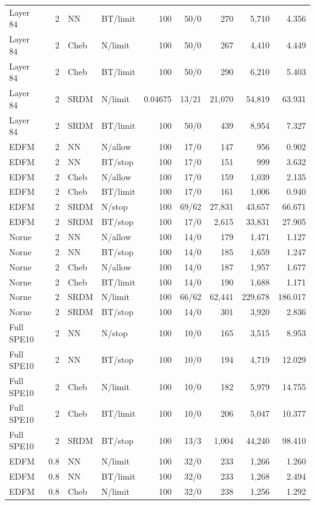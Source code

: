 {\begin{longtable}{lrllrrrrr}
Layer 84 & 2 & NN & BT/limit & 100 & 50/0 & 270 & 5,710 & 4.356 \\
Layer 84 & 2 & Cheb & N/limit & 100 & 50/0 & 267 & 4,410 & 4.449 \\
Layer 84 & 2 & Cheb & BT/limit & 100 & 50/0 & 290 & 6,210 & 5.403 \\
Layer 84 & 2 & SRDM & N/limit & 0.04675 & 13/21 & 21,070 & 54,819 & 63.931 \\
Layer 84 & 2 & SRDM & BT/limit & 100 & 50/0 & 439 & 8,954 & 7.327 \\
EDFM & 2 & NN & N/allow & 100 & 17/0 & 147 & 956 & 0.902 \\
EDFM & 2 & NN & BT/stop & 100 & 17/0 & 151 & 999 & 3.632 \\
EDFM & 2 & Cheb & N/allow & 100 & 17/0 & 159 & 1,039 & 2.135 \\
EDFM & 2 & Cheb & BT/limit & 100 & 17/0 & 161 & 1,006 & 0.940 \\
EDFM & 2 & SRDM & N/stop & 100 & 69/62 & 27,831 & 43,657 & 66.671 \\
EDFM & 2 & SRDM & BT/stop & 100 & 17/0 & 2,615 & 33,831 & 27.905 \\
Norne & 2 & NN & N/allow & 100 & 14/0 & 179 & 1,471 & 1.127 \\
Norne & 2 & NN & BT/stop & 100 & 14/0 & 185 & 1,659 & 1.247 \\
Norne & 2 & Cheb & N/allow & 100 & 14/0 & 187 & 1,957 & 1.677 \\
Norne & 2 & Cheb & BT/limit & 100 & 14/0 & 190 & 1,688 & 1.171 \\
Norne & 2 & SRDM & N/limit & 100 & 66/62 & 62,441 & 229,678 & 186.017 \\
Norne & 2 & SRDM & BT/stop & 100 & 14/0 & 301 & 3,920 & 2.836 \\
Full SPE10 & 2 & NN & N/stop & 100 & 10/0 & 165 & 3,515 & 8.953 \\
Full SPE10 & 2 & NN & BT/stop & 100 & 10/0 & 194 & 4,719 & 12.029 \\
Full SPE10 & 2 & Cheb & N/limit & 100 & 10/0 & 182 & 5,979 & 14.755 \\
Full SPE10 & 2 & Cheb & BT/limit & 100 & 10/0 & 206 & 5,047 & 10.377 \\
Full SPE10 & 2 & SRDM & BT/stop & 100 & 13/3 & 1,004 & 44,240 & 98.410 \\
EDFM & 0.8 & NN & N/limit & 100 & 32/0 & 233 & 1,266 & 1.260 \\
EDFM & 0.8 & NN & BT/limit & 100 & 32/0 & 233 & 1,268 & 2.494 \\
EDFM & 0.8 & Cheb & N/limit & 100 & 32/0 & 238 & 1,256 & 1.292 \\

\end{longtable}}
